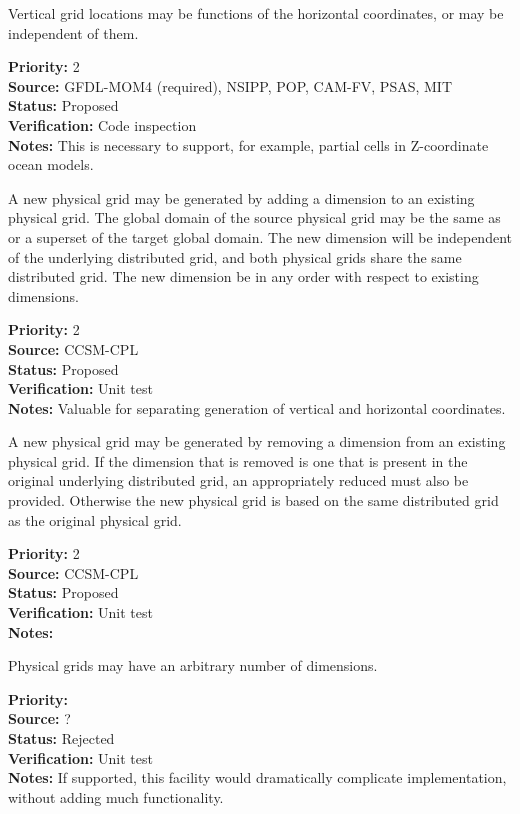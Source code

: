 Vertical grid locations may be functions of the horizontal coordinates, or may be
independent of them.
\begin{reqlist}
{\bf Priority:} 2 \\
{\bf Source:} GFDL-MOM4 (required), NSIPP, POP, 
              CAM-FV, PSAS, MIT \\
{\bf Status:} Proposed \\
{\bf Verification:} Code inspection\\
{\bf Notes:} This is necessary to support, for example, partial cells in
Z-coordinate ocean models.
\end{reqlist}

A new physical grid may be generated by adding a dimension to an existing physical grid.
The global domain of the source physical grid may be the same as or a superset of
the target global domain.  The new dimension will be independent of the underlying
distributed grid, and both physical grids share the same distributed grid.  The new
dimension be in any order with respect to existing dimensions.
\begin{reqlist}
{\bf Priority:} 2 \\
{\bf Source:} CCSM-CPL \\
{\bf Status:} Proposed \\
{\bf Verification:} Unit test\\
{\bf Notes:} Valuable for separating generation of vertical and horizontal
coordinates.
\end{reqlist}

A new physical grid may be generated by removing a dimension from an existing physical grid.
If the dimension that is removed is one that is present in the original underlying
distributed grid, an appropriately reduced must also be provided.  Otherwise the new physical
grid is based on the same distributed grid as the original physical grid.
\begin{reqlist}
{\bf Priority:} 2 \\
{\bf Source:} CCSM-CPL \\
{\bf Status:} Proposed \\
{\bf Verification:} Unit test\\
{\bf Notes:} 
\end{reqlist}

Physical grids may have an arbitrary number of dimensions. 
\begin{reqlist}
{\bf Priority:} \\
{\bf Source:} ? \\
{\bf Status:} Rejected\\
{\bf Verification:} Unit test\\
{\bf Notes:} If supported, this facility would dramatically complicate implementation,
without adding much functionality.
\end{reqlist}

